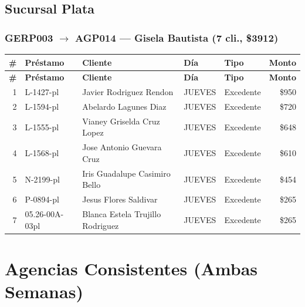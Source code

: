 \documentclass[11pt,a4paper]{article}
\newcommand{\money}[1]{\$\num{#1}}
\begin{document}
\subsection{Sucursal Plata}

\subsubsection{GERP003 $\rightarrow$ AGP014 --- Gisela Bautista (7 cli., \money{3912})}


\begin{center}
\renewcommand{\arraystretch}{1.1}
\footnotesize
\begin{longtable}{rlp{5.5cm}llr}
\toprule
\textbf{\#} & \textbf{Pr\'estamo} & \textbf{Cliente} & \textbf{D\'ia} & \textbf{Tipo} & \textbf{Monto} \\
\midrule
\endfirsthead
\toprule
\textbf{\#} & \textbf{Pr\'estamo} & \textbf{Cliente} & \textbf{D\'ia} & \textbf{Tipo} & \textbf{Monto} \\
\midrule
\endhead
1 & L-1427-pl & Javier Rodriguez Rendon & JUEVES & Excedente & \money{950} \\
2 & L-1594-pl & Abelardo Lagunes Diaz & JUEVES & Excedente & \money{720} \\
3 & L-1555-pl & Vianey Griselda Cruz Lopez & JUEVES & Excedente & \money{648} \\
4 & L-1568-pl & Jose Antonio Guevara Cruz & JUEVES & Excedente & \money{610} \\
5 & N-2199-pl & Iris Guadalupe Casimiro Bello & JUEVES & Excedente & \money{454} \\
6 & P-0894-pl & Jesus Flores Saldivar & JUEVES & Excedente & \money{265} \\
7 & 05.26-00A-03pl & Blanca Estela Trujillo Rodriguez & JUEVES & Excedente & \money{265} \\

\bottomrule
\end{longtable}
\end{center}
\newpage

\section{Agencias Consistentes (Ambas Semanas)}
\end{document}
